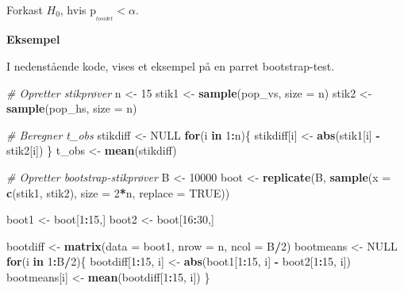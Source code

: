 \documentclass[
]{book}
\newenvironment{Shaded}{\begin{snugshade}}{\end{snugshade}}
\newcommand{\CommentTok}[1]{\textcolor[rgb]{0.56,0.35,0.01}{\textit{#1}}}
\newcommand{\ControlFlowTok}[1]{\textcolor[rgb]{0.13,0.29,0.53}{\textbf{#1}}}
\newcommand{\DataTypeTok}[1]{\textcolor[rgb]{0.13,0.29,0.53}{#1}}
\newcommand{\DecValTok}[1]{\textcolor[rgb]{0.00,0.00,0.81}{#1}}
\newcommand{\KeywordTok}[1]{\textcolor[rgb]{0.13,0.29,0.53}{\textbf{#1}}}
\newcommand{\NormalTok}[1]{#1}
\newcommand{\OperatorTok}[1]{\textcolor[rgb]{0.81,0.36,0.00}{\textbf{#1}}}
\newcommand{\OtherTok}[1]{\textcolor[rgb]{0.56,0.35,0.01}{#1}}
\newcommand{\StringTok}[1]{\textcolor[rgb]{0.31,0.60,0.02}{#1}}
\theoremstyle{definition}
\theoremstyle{definition}
\theoremstyle{definition}
\theoremstyle{remark}
\begin{document}
Forkast \(H_0\), hvis \(\text{p}_{_{tosidet}}<\alpha\).

\textbf{Eksempel}

I nedenstående kode, vises et eksempel på en parret bootstrap-test.

\begin{Shaded}
\begin{Highlighting}[]
\CommentTok{# Opretter stikprøver}
\NormalTok{n <-}\StringTok{ }\DecValTok{15}
\NormalTok{stik1 <-}\StringTok{ }\KeywordTok{sample}\NormalTok{(pop_vs, }\DataTypeTok{size =}\NormalTok{ n)}
\NormalTok{stik2 <-}\StringTok{ }\KeywordTok{sample}\NormalTok{(pop_hs, }\DataTypeTok{size =}\NormalTok{ n)}

\CommentTok{# Beregner t_obs}
\NormalTok{stikdiff <-}\StringTok{ }\OtherTok{NULL}
\ControlFlowTok{for}\NormalTok{(i }\ControlFlowTok{in} \DecValTok{1}\OperatorTok{:}\NormalTok{n)\{}
\NormalTok{  stikdiff[i] <-}\StringTok{ }\KeywordTok{abs}\NormalTok{(stik1[i] }\OperatorTok{-}\StringTok{ }\NormalTok{stik2[i])}
\NormalTok{\}}
\NormalTok{t_obs <-}\StringTok{ }\KeywordTok{mean}\NormalTok{(stikdiff)}

\CommentTok{# Opretter bootstrap-stikprøver}
\NormalTok{B <-}\StringTok{ }\DecValTok{10000}
\NormalTok{boot <-}\StringTok{ }\KeywordTok{replicate}\NormalTok{(B, }\KeywordTok{sample}\NormalTok{(}\DataTypeTok{x =} \KeywordTok{c}\NormalTok{(stik1, stik2), }\DataTypeTok{size =} \DecValTok{2}\OperatorTok{*}\NormalTok{n, }\DataTypeTok{replace =} \OtherTok{TRUE}\NormalTok{))}

\NormalTok{boot1 <-}\StringTok{ }\NormalTok{boot[}\DecValTok{1}\OperatorTok{:}\DecValTok{15}\NormalTok{,]}
\NormalTok{boot2 <-}\StringTok{ }\NormalTok{boot[}\DecValTok{16}\OperatorTok{:}\DecValTok{30}\NormalTok{,]}

\NormalTok{bootdiff <-}\StringTok{ }\KeywordTok{matrix}\NormalTok{(}\DataTypeTok{data =}\NormalTok{ boot1, }\DataTypeTok{nrow =}\NormalTok{ n, }\DataTypeTok{ncol =}\NormalTok{ B}\OperatorTok{/}\DecValTok{2}\NormalTok{)}
\NormalTok{bootmeans <-}\StringTok{ }\OtherTok{NULL}
\ControlFlowTok{for}\NormalTok{(i }\ControlFlowTok{in} \DecValTok{1}\OperatorTok{:}\NormalTok{B}\OperatorTok{/}\DecValTok{2}\NormalTok{)\{}
\NormalTok{  bootdiff[}\DecValTok{1}\OperatorTok{:}\DecValTok{15}\NormalTok{, i] <-}\StringTok{ }\KeywordTok{abs}\NormalTok{(boot1[}\DecValTok{1}\OperatorTok{:}\DecValTok{15}\NormalTok{, i] }\OperatorTok{-}\StringTok{ }\NormalTok{boot2[}\DecValTok{1}\OperatorTok{:}\DecValTok{15}\NormalTok{, i])}
\NormalTok{  bootmeans[i] <-}\StringTok{ }\KeywordTok{mean}\NormalTok{(bootdiff[}\DecValTok{1}\OperatorTok{:}\DecValTok{15}\NormalTok{, i])}
\NormalTok{\}}


\end{Highlighting}
\end{Shaded}
\end{document}
